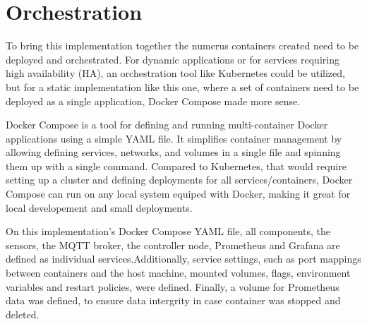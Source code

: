 \FloatBarrier
\section{Orchestration}
To bring this implementation together the numerus containers created need to be deployed and orchestrated. For dynamic applications or for services requiring high availability (HA), an orchestration tool like Kubernetes could be utilized, but for a static implementation like this one, where a set of containers need to be deployed as a single application, Docker Compose made more sense.

Docker Compose is a tool for defining and running multi-container Docker applications using a simple YAML file. It simplifies container management by allowing defining services, networks, and volumes in a single file and spinning them up with a single command. Compared to Kubernetes, that would require setting up a cluster and defining deployments for all services/containers, Docker Compose can run on any local system equiped with Docker, making it great for local developement and small deployments.

On this implementation's Docker Compose YAML file, all components, the sensors, the MQTT broker, the controller node, Prometheus and Grafana are defined as individual services.Additionally, service settings, such as port mappings between containers and the host machine, mounted volumes, flags, environment variables and restart policies, were defined. Finally, a volume for Prometheus data was defined, to ensure data intergrity in case container was stopped and deleted.

